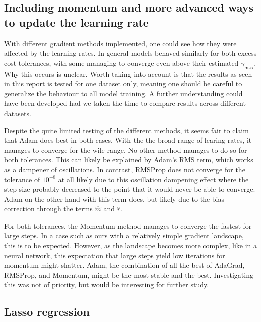 \documentclass[reprint,english,notitlepage]{revtex4-2}  %
\begin{document}
\subsection{Including momentum and more advanced ways to update the learning rate} %
With different gradient methods implemented, one could see how they were affected by the learning rates. In general models behaved similarly for both excess cost tolerances, with some managing to converge even above their estimated $\gamma_\text{max}$. Why this occurs is unclear. Worth taking into account is that the results as seen in this report is tested for one dataset only, meaning one should be careful to generalize the behaviour to all model training. A further understanding could have been developed had we taken the time to compare results across different datasets. 

Despite the quite limited testing of the different methods, it seems fair to claim that Adam does best in both cases. With the the broad range of learing rates, it manages to converge for the wile range. No other method manages to do so for both tolerances. This can likely be explained by Adam's RMS term, which works as a dampener of oscillations. In contrast, RMSProp does not converge for the tolerance of $10^{-8}$ at all likely due to this oscillation dampening effect where the step size probably decreased to the point that it would never be able to converge. Adam on the other hand with this term does, but likely due to the bias correction through the terms $\hat{m}$ and $\hat{r}$. 

For both tolerances, the Momentum method manages to converge the fastest for large steps. In a case such as ours with a relatively simple gradient landscape, this is to be expected. However, as the landscape becomes more complex, like in a neural network, this expectation that large steps yield low iterations for momentum might shatter. Adam, the combination of all the best of AdaGrad, RMSProp, and Momentum, might be the most stable and the best. Investigating this was not of priority, but would be interesting for further study.



\subsection{Lasso regression} %
\end{document}
